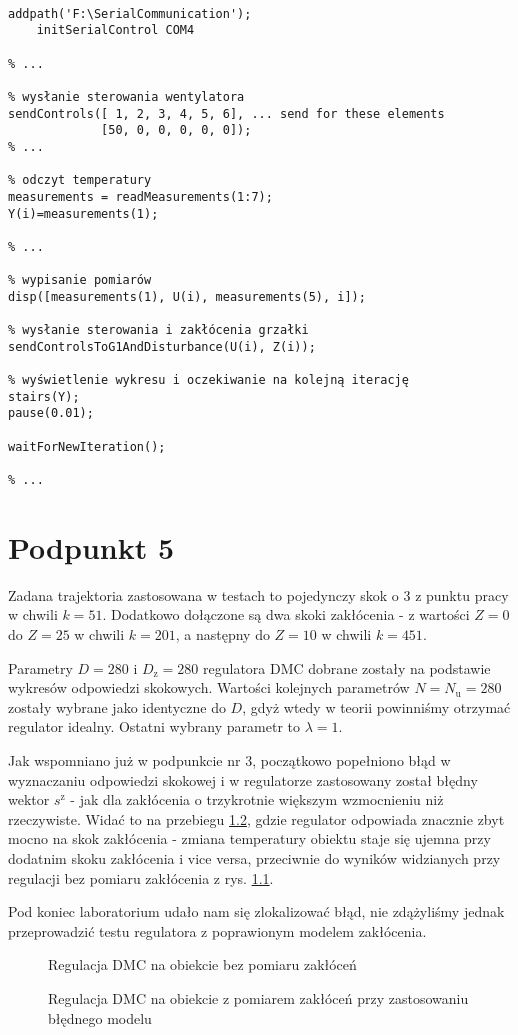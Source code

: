 \begin{lstlisting}[style=Matlab-editor]
% rozpoczęcie komunikacji ze stanowiskiem

addpath('F:\SerialCommunication');
    initSerialControl COM4

% ...

% wysłanie sterowania wentylatora
sendControls([ 1, 2, 3, 4, 5, 6], ... send for these elements
             [50, 0, 0, 0, 0, 0]);
% ...

% odczyt temperatury
measurements = readMeasurements(1:7);
Y(i)=measurements(1);

% ...

% wypisanie pomiarów
disp([measurements(1), U(i), measurements(5), i]);

% wysłanie sterowania i zakłócenia grzałki
sendControlsToG1AndDisturbance(U(i), Z(i));

% wyświetlenie wykresu i oczekiwanie na kolejną iterację
stairs(Y);
pause(0.01);

waitForNewIteration();

% ...
\end{lstlisting}

\chapter{Podpunkt 5}
Zadana trajektoria zastosowana w testach to pojedynczy skok o \num{3} z punktu pracy w chwili $ k = 51 $. Dodatkowo dołączone są dwa skoki zakłócenia - z wartości $ Z = 0 $ do $ Z = 25 $ w chwili $ k = 201 $, a następny do $ Z = 10 $ w chwili $ k = 451 $.

Parametry $ D = 280 $ i $ D_\mathrm{z} = 280 $ regulatora DMC dobrane zostały na podstawie wykresów odpowiedzi skokowych. Wartości kolejnych parametrów $ N = N_\mathrm{u} = 280 $ zostały wybrane jako identyczne do $ D $, gdyż wtedy w teorii powinniśmy otrzymać regulator idealny. Ostatni wybrany parametr to $ \lambda = 1 $.

Jak wspomniano już w podpunkcie nr 3, początkowo popełniono błąd w wyznaczaniu odpowiedzi skokowej i w regulatorze zastosowany został błędny wektor $ s^{\mathrm{z}} $ - jak dla zakłócenia o trzykrotnie większym wzmocnieniu niż rzeczywiste. Widać to na przebiegu \ref{R8}, gdzie regulator odpowiada znacznie zbyt mocno na skok zakłócenia - zmiana temperatury obiektu staje się ujemna przy dodatnim skoku zakłócenia i vice versa, przeciwnie do wyników widzianych przy regulacji bez pomiaru zakłócenia z rys. \ref{R7}.

Pod koniec laboratorium udało nam się zlokalizować błąd, nie zdążyliśmy jednak przeprowadzić testu regulatora z poprawionym modelem zakłócenia.

\begin{figure}[ht]
\centering

\caption{Regulacja DMC na obiekcie bez pomiaru zakłóceń}
\label{R7}
\end{figure}

\begin{figure}[ht]
\centering

\caption{Regulacja DMC na obiekcie z pomiarem zakłóceń przy zastosowaniu błędnego modelu}
\label{R8}
\end{figure}

